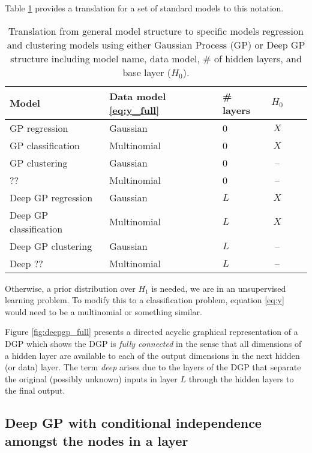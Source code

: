 \documentclass{article}
\newcommand{\1}{\mathbbm{1}}
\begin{document}
Table \ref{tab:translation} provides a translation for a set of standard models
to this notation.
\begin{table}[htb]
\begin{minipage}{0.85\textwidth}
\caption{Translation from general model structure to specific models regression
and clustering models using either Gaussian Process (GP) or Deep GP structure
including model name, data model, \# of hidden layers, and base layer ($H_0$). 
}
\vspace{1pt}
\end{minipage}
\label{tab:translation}
\centering
\begin{tabular}{lllccc}
\hline
Model & Data model \eqref{eq:y_full} & \# layers & $H_0$\\
\hline
GP regression     & Gaussian    & 0 & $X$ \\
GP classification & Multinomial & 0 & $X$ \\
GP clustering     & Gaussian    & 0 & --  \\
??                & Multinomial & 0 & --  \\
\hline
Deep GP regression     & Gaussian    & $L$ & $X$ \\
Deep GP classification & Multinomial & $L$ & $X$ \\
Deep GP clustering     & Gaussian    & $L$ & --  \\
Deep ??                & Multinomial & $L$ & --  \\
\hline
\end{tabular}
\end{table}

Otherwise, a prior distribution over $H_1$ is needed, we are in an
unsupervised learning problem.
To modify this to a classification problem, equation \eqref{eq:y} would need to
be a multinomial or something similar.

Figure \ref{fig:deepgp_full} presents a directed acyclic graphical representation
of a DGP which shows the DGP is \emph{fully connected} in the sense that all
dimensions of a hidden layer are available to each of the output dimensions
in the next hidden (or data) layer.
The term \emph{deep} arises due to the layers of the DGP that separate
the original (possibly unknown) inputs in layer $L$ through the hidden layers
to the final output. 


\subsection{Deep GP with conditional independence amongst the nodes in a layer}
\end{document}
